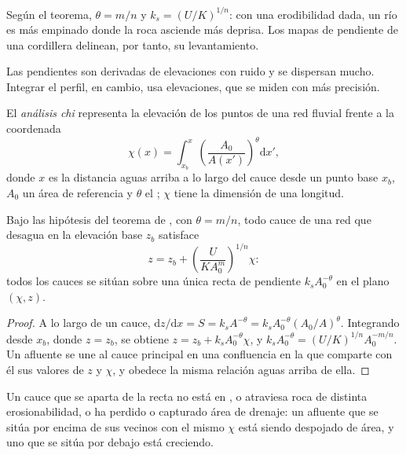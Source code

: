 Según el teorema, $\theta = m/n$ y $k_s = (U/K)^{1/n}$: con una erodibilidad dada, un río es más
empinado donde la roca asciende más deprisa. Los mapas de pendiente de una cordillera delinean,
por tanto, su levantamiento.


Las pendientes son derivadas de elevaciones con ruido y se dispersan mucho. Integrar
el perfil, en cambio, usa elevaciones, que se miden con más precisión.

\begin{definition}\label{def:b3:quantitative-geomorphology:chi}
El \emph{análisis chi} representa la elevación de los puntos
de una red fluvial frente a la coordenada
\[
\chi(x) = \int_{x_b}^{x} \left(\frac{A_0}{A(x')}\right)^{\theta}
\mathrm{d}x' ,
\]
donde $x$ es la distancia aguas arriba a lo largo del cauce desde un punto base
$x_b$, $A_0$ un área de referencia y $\theta$ el ; $\chi$ tiene
la dimensión de una longitud.
\end{definition}

\begin{proposition}\label{prop:b3:quantitative-geomorphology:chi}
Bajo las hipótesis del teorema de , con $\theta = m/n$,
todo cauce de una red que desagua en la elevación base $z_b$ satisface
\[
z = z_b + \left(\frac{U}{K A_0^{m}}\right)^{1/n} \chi :
\]
todos los cauces se sitúan sobre una única recta de pendiente $k_s A_0^{-\theta}$ en el
plano $(\chi, z)$.
\end{proposition}

\begin{proof}
A lo largo de un cauce, $\mathrm{d}z/\mathrm{d}x = S = k_s A^{-\theta} = k_s
A_0^{-\theta}(A_0/A)^{\theta}$. Integrando desde $x_b$, donde $z = z_b$,
se obtiene $z = z_b + k_s A_0^{-\theta}\chi$, y $k_s A_0^{-\theta} =
(U/K)^{1/n} A_0^{-m/n}$. Un afluente se une al cauce principal en una confluencia en la que
comparte con él sus valores de $z$ y $\chi$, y obedece la misma relación aguas arriba de ella.
\end{proof}

Un cauce que se aparta de la recta no está en , o atraviesa
roca de distinta erosionabilidad, o ha perdido o capturado área de drenaje: un
afluente que se sitúa por encima de sus vecinos con el mismo $\chi$ está siendo
despojado de área, y uno que se sitúa por debajo está creciendo.

